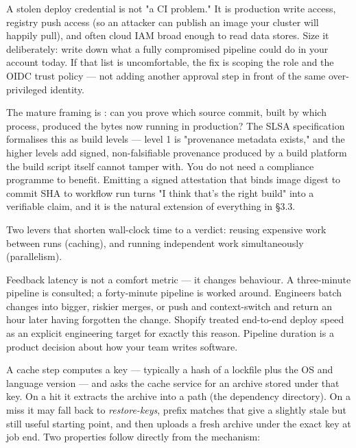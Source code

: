 \begin{secwarn}
A stolen deploy credential is not "a CI problem." It is production write access, registry push access (so an attacker can publish an image your cluster will happily pull), and often cloud IAM broad enough to read data stores. Size it deliberately: write down what a fully compromised pipeline could do in your account today. If that list is uncomfortable, the fix is scoping the role and the OIDC trust policy --- not adding another approval step in front of the same over-privileged identity.
\end{secwarn}

\begin{seniornote}
The mature framing is : can you prove which source commit, built by which process, produced the bytes now running in production? The SLSA specification formalises this as build levels --- level 1 is "provenance metadata exists," and the higher levels add signed, non-falsifiable provenance produced by a build platform the build script itself cannot tamper with. You do not need a compliance programme to benefit. Emitting a signed attestation that binds image digest to commit SHA to workflow run turns "I think that's the right build" into a verifiable claim, and it is the natural extension of everything in \S3.3.
\end{seniornote}


 Two levers that shorten wall-clock time to a verdict: reusing expensive work between runs (caching), and running independent work simultaneously (parallelism).

 Feedback latency is not a comfort metric --- it changes behaviour. A three-minute pipeline is consulted; a forty-minute pipeline is worked around. Engineers batch changes into bigger, riskier merges, or push and context-switch and return an hour later having forgotten the change. Shopify treated end-to-end deploy speed as an explicit engineering target for exactly this reason. Pipeline duration is a product decision about how your team writes software.

 A cache step computes a key --- typically a hash of a lockfile plus the OS and language version --- and asks the cache service for an archive stored under that key. On a hit it extracts the archive into a path (the dependency directory). On a miss it may fall back to \emph{restore-keys}, prefix matches that give a slightly stale but still useful starting point, and then uploads a fresh archive under the exact key at job end. Two properties follow directly from the mechanism:

